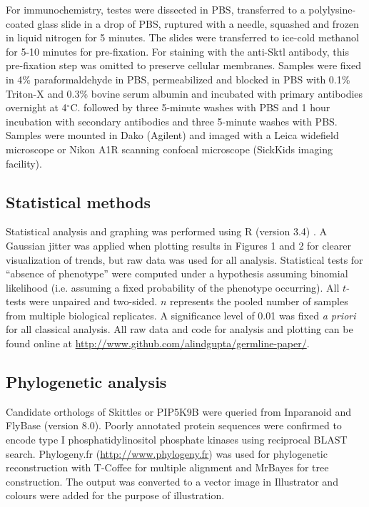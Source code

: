 \documentclass[12pt, twoside, letterpaper]{article}
\begin{document}
\begin{doublespacing}
\begin{linenumbers}
    For immunochemistry, testes were dissected in PBS,
    transferred to a polylysine-coated glass slide in a drop of PBS,
    ruptured with a needle, squashed and frozen in liquid nitrogen for 5 minutes.
    The slides were transferred to ice-cold methanol for 5-10 minutes for pre-fixation.
    For staining with the anti-Sktl antibody, this pre-fixation step
    was omitted to preserve cellular membranes.
    Samples were fixed in 4\% paraformaldehyde in PBS,
    permeabilized and blocked in PBS with 0.1\% Triton-X and 0.3\% bovine
    serum albumin and incubated with primary antibodies overnight at 4$^{\circ}$C.
    followed by three 5-minute washes with PBS and 1 hour incubation
    with secondary antibodies and three 5-minute washes with PBS.
    Samples were mounted in Dako (Agilent) and imaged with
    a Leica widefield microscope
    or Nikon A1R scanning confocal microscope (SickKids imaging facility).

    \subsection{Statistical methods}
    Statistical analysis and graphing was performed using R (version 3.4)
    \citep{r}.
    A Gaussian jitter was applied when plotting
    results in Figures 1 and 2 for clearer visualization of trends,
    but raw data was used for all analysis.
    Statistical tests for ``absence of phenotype'' were computed under a
    hypothesis assuming binomial likelihood (i.e. assuming a fixed probability of the
    phenotype occurring).
    All $t$-tests were unpaired and two-sided.
    $n$ represents the pooled number of samples from multiple biological replicates.
    A significance level of 0.01 was fixed \textit{a priori} for all classical analysis.
    All raw data and code for analysis and plotting can be found online
    at \url{http://www.github.com/alindgupta/germline-paper/}.

    \subsection{Phylogenetic analysis}
    Candidate orthologs of Skittles or PIP5K9B were queried
    from Inparanoid and FlyBase (version 8.0).
    Poorly annotated protein sequences were confirmed
    to encode type I phosphatidylinositol phosphate
    kinases using reciprocal BLAST search.
    Phylogeny.fr (\url{http://www.phylogeny.fr}) was used for
    phylogenetic reconstruction with T-Coffee for multiple alignment
    and MrBayes for tree construction.
    The output was converted to a vector image in Illustrator
    and colours were added for the purpose of illustration.


\end{linenumbers}
\end{doublespacing}
\end{document}
